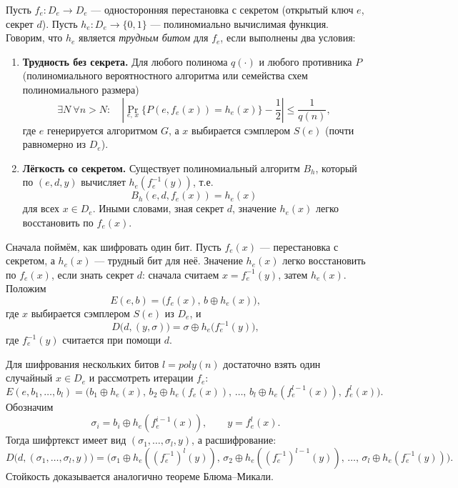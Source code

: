 \begin{definition}
    Пусть \(f_e: D_e \to D_e\) --- односторонняя перестановка с секретом (открытый ключ \(e\), секрет \(d\)).  
    Пусть \(h_e: D_e \to \{0,1\}\) --- полиномиально вычислимая функция.  
    Говорим, что \(h_e\) является \emph{трудным битом} для \(f_e\), если выполнены два условия:
    \begin{enumerate}
        \item \textbf{Трудность без секрета.} Для любого полинома \(q(\cdot)\) и любого противника \(P\) (полиномиального вероятностного алгоритма или семейства схем полиномиального размера)
        \[
            \exists N\ \forall n>N:\quad
            \left|\Pr_{e,\,x}\{P(e, f_e(x)) = h_e(x)\} - \frac12\right| \le \frac{1}{q(n)},
        \]
        где \(e\) генерируется алгоритмом \(G\), а \(x\) выбирается сэмплером \(S(e)\) (почти равномерно из \(D_e\)).
        \item \textbf{Лёгкость со секретом.} Существует полиномиальный алгоритм \(B_h\), который по \((e,d,y)\) вычисляет \(h_e(f_e^{-1}(y))\), т.е.
        \[
            B_h(e,d,f_e(x)) = h_e(x)
        \]
        для всех \(x \in D_e\). Иными словами, зная секрет \(d\), значение \(h_e(x)\) легко восстановить по \(f_e(x)\).
    \end{enumerate}
\end{definition}

\begin{example}
    Сначала поймём, как шифровать один бит. Пусть \(f_e(x)\) --- перестановка с секретом, а \(h_e(x)\) --- трудный бит для неё. Значение \(h_e(x)\) легко восстановить по \(f_e(x)\), если знать секрет \(d\): сначала считаем \(x=f_e^{-1}(y)\), затем \(h_e(x)\). Положим
    \[
        E(e,b)=\bigl(f_e(x),\, b\oplus h_e(x)\bigr),
    \]
    где \(x\) выбирается сэмплером \(S(e)\) из \(D_e\), и
    \[
        D\bigl(d,(y,\sigma)\bigr)=\sigma\oplus h_e\bigl(f_e^{-1}(y)\bigr),
    \]
    где \(f_e^{-1}(y)\) считается при помощи \(d\).

    Для шифрования нескольких битов \(l=poly(n)\) достаточно взять один случайный \(x\in D_e\) и рассмотреть итерации \(f_e\):
    \[
        E(e,b_1,\dots,b_l)=
        \bigl(
            b_1\oplus h_e(x),\,
            b_2\oplus h_e(f_e(x)),\,
            \dots,\,
            b_l\oplus h_e(f_e^{l-1}(x)),\,
            f_e^l(x)
        \bigr).
    \]
    Обозначим
    \[
        \sigma_i=b_i\oplus h_e(f_e^{i-1}(x)),\qquad y=f_e^l(x).
    \]
    Тогда шифртекст имеет вид \((\sigma_1,\dots,\sigma_l,y)\), а расшифрование:
    \[
        D\bigl(d,(\sigma_1,\dots,\sigma_l,y)\bigr)=
        \bigl(
            \sigma_1\oplus h_e((f_e^{-1})^l(y)),\,
            \sigma_2\oplus h_e((f_e^{-1})^{l-1}(y)),\,
            \dots,\,
            \sigma_l\oplus h_e(f_e^{-1}(y))
        \bigr).
    \]
    Стойкость доказывается аналогично теореме Блюма--Микали.
\end{example}

